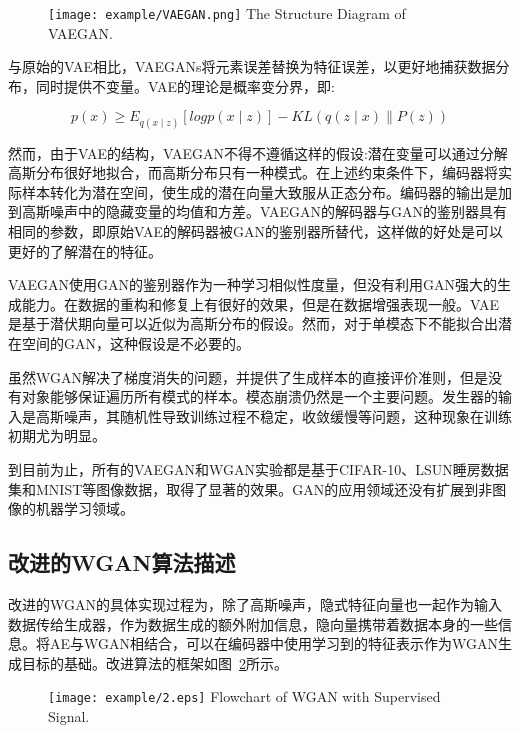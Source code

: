 \begin{figure}[htbp]
	\centering
	\texttt{[image: example/VAEGAN.png]}
	{The Structure Diagram of VAEGAN.}
	\label{figVAEGAN}
\end{figure}

与原始的VAE相比，VAEGANs将元素误差替换为特征误差，以更好地捕获数据分布，同时提供不变量\cite{7}。VAE的理论是概率变分界\cite{16}，即:

\begin{equation}
\label{eq18}
p(x)\geq E_{q(x\mid z)}[log p (x\mid z)]- KL(q(z\mid x)\parallel P (z))
\end{equation}

然而，由于VAE的结构，VAEGAN不得不遵循这样的假设:潜在变量可以通过分解高斯分布很好地拟合，而高斯分布只有一种模式。在上述约束条件下，编码器将实际样本转化为潜在空间，使生成的潜在向量大致服从正态分布。编码器的输出是加到高斯噪声中的隐藏变量的均值和方差。VAEGAN的解码器与GAN的鉴别器具有相同的参数，即原始VAE的解码器被GAN的鉴别器所替代，这样做的好处是可以更好的了解潜在的特征。

VAEGAN使用GAN的鉴别器作为一种学习相似性度量，但没有利用GAN强大的生成能力。在数据的重构和修复上有很好的效果，但是在数据增强表现一般。VAE是基于潜伏期向量可以近似为高斯分布的假设。然而，对于单模态下不能拟合出潜在空间的GAN，这种假设是不必要的。

虽然WGAN解决了梯度消失的问题，并提供了生成样本的直接评价准则，但是没有对象能够保证遍历所有模式的样本。模态崩溃仍然是一个主要问题。发生器的输入是高斯噪声，其随机性导致训练过程不稳定，收敛缓慢\cite{17}等问题，这种现象在训练初期尤为明显。

到目前为止，所有的VAEGAN和WGAN实验都是基于CIFAR-10、LSUN睡房数据集和MNIST等图像数据，取得了显著的效果。GAN的应用领域还没有扩展到非图像的机器学习领域。

\subsection{改进的WGAN算法描述}
改进的WGAN的具体实现过程为，除了高斯噪声，隐式特征向量也一起作为输入数据传给生成器，作为数据生成的额外附加信息，隐向量携带着数据本身的一些信息。将AE与WGAN相结合，可以在编码器中使用学习到的特征表示作为WGAN生成目标的基础。改进算法的框架如图~\ref{fig2}所示。

\begin{figure}[htbp]
	\centering
	\texttt{[image: example/2.eps]}
	{Flowchart of WGAN with Supervised Signal.}
	\label{fig2}
\end{figure}

